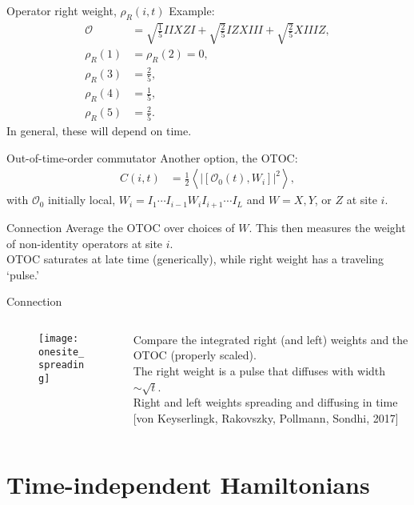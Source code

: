 \documentclass{beamer}
\newcommand{\half}{\frac{1}{2}}
\renewcommand{\th}[1]{\frac{1}{#1}}
\newcommand{\ex}[1]{\left\langle #1 \right\rangle}
\newcommand{\nn}{\nonumber\\}
\begin{document}
\begin{frame}{Operator right weight, $\rho_R(i,t)$}
Example:
\begin{align}
\mathcal{O} &= \sqrt{\th{5}} IIXZI + \sqrt{\frac{2}{5}} IZXIII + \sqrt{\frac{2}{5}} XIIIZ,\nn
\rho_R(1) &= \rho_R(2) = 0,\nn
\rho_R(3) &= \frac{2}{5},\nn
\rho_R(4) &= \frac{1}{5},\nn
\rho_R(5) &= \frac{2}{5}.\nonumber
\end{align}
In general, these will depend on time.
\end{frame}

\begin{frame}{Out-of-time-order commutator}
Another option, the OTOC:
\begin{align*}
C(i,t) &= \half\ex{|[\mathcal{O}_0(t), W_i]|^2},
\end{align*}
with $\mathcal{O}_0$ initially local, $W_i=I_1\cdots I_{i-1}W_iI_{i+1}\cdots I_L$ and $W=X,Y$, or $Z$ at site $i$.
\end{frame}

\begin{frame}{Connection}
Average the OTOC over choices of $W$. This then measures the weight of non-identity operators at site $i$.\\
OTOC saturates at late time (generically), while right weight has a traveling `pulse.'
\end{frame}

\begin{frame}{Connection}
\begin{columns}
	\begin{column}{0.5\textwidth}  %
		\begin{figure}
			\centering
			\texttt{[image: onesite\_spreading]}
		\end{figure}
	\end{column}
	\begin{column}{0.5\textwidth}
		Compare the integrated right (and left) weights and the OTOC (properly scaled).\\
		\bigskip
		The right weight is a pulse that diffuses with width $\sim \sqrt{t}$.\\
		\bigskip
		\bigskip
		Right and left weights spreading and diffusing in time [von Keyserlingk, Rakovszky, Pollmann, Sondhi, 2017]
		\bigskip
	\end{column}
\end{columns}
\end{frame}

\section{Time-independent Hamiltonians}
\end{document}
